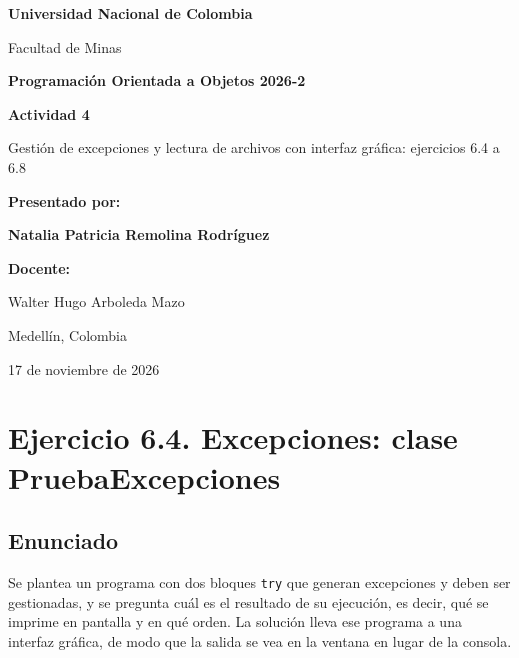 \documentclass[11pt, a4paper]{article}
\begin{document}
\begin{titlepage}
    \centering
    \vspace*{1cm}

    {\huge \textbf{Universidad Nacional de Colombia}\par}
    \vspace{0.5cm}
    {\Large Facultad de Minas\par}
    \vspace{1.5cm}

    {\Large \textbf{Programación Orientada a Objetos 2026-2}\par}
    \vspace{2cm}

    {\huge \textbf{Actividad 4}\par}
    \vspace{0.5cm}
    {\large Gestión de excepciones y lectura de archivos con interfaz gráfica: ejercicios 6.4 a 6.8\par}

    \vspace{3cm}

    \textbf{Presentado por:}\par
    \vspace{0.5cm}
    {\Large \textbf{Natalia Patricia Remolina Rodríguez}\par}

    \vspace{2cm}

    \textbf{Docente:}\par
    Walter Hugo Arboleda Mazo\par

    \vspace{2cm}

    Medellín, Colombia\par
    17 de noviembre de 2026
\end{titlepage}

\section{Ejercicio 6.4. Excepciones: clase PruebaExcepciones}

\subsection{Enunciado}
Se plantea un programa con dos bloques \texttt{try} que generan excepciones y deben ser
gestionadas, y se pregunta cuál es el resultado de su ejecución, es decir, qué se imprime en
pantalla y en qué orden. La solución lleva ese programa a una interfaz gráfica, de modo que la
salida se vea en la ventana en lugar de la consola.
\end{document}
